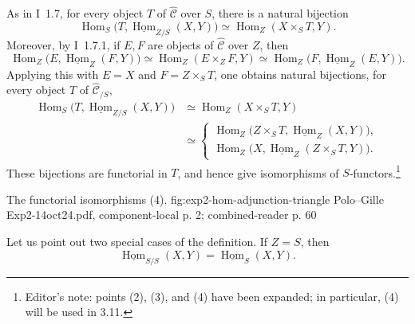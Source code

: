 As in I~1.7, for every object \(T\) of \(\widehat{\mathscr C}\) over
\(S\), there is a natural bijection
\begin{equation}
  \operatorname{Hom}_S
    \bigl(T,\underline{\operatorname{Hom}}_{Z/S}(X,Y)\bigr)
  \simeq \operatorname{Hom}_Z(X\times_S T,Y).
  \tag{2}
\end{equation}
Moreover, by I~1.7.1, if \(E,F\) are objects of
\(\widehat{\mathscr C}\) over \(Z\), then
\[
  \operatorname{Hom}_Z\bigl(E,\underline{\operatorname{Hom}}_Z(F,Y)\bigr)
  \simeq \operatorname{Hom}_Z(E\times_ZF,Y)
  \simeq
  \operatorname{Hom}_Z\bigl(F,\underline{\operatorname{Hom}}_Z(E,Y)\bigr).
\]
Applying this with \(E=X\) and \(F=Z\times_ST\), one obtains natural
bijections, for every object \(T\) of
\(\widehat{\mathscr C}_{/S}\),
\begin{equation}
\begin{aligned}
  \operatorname{Hom}_S
    \bigl(T,\underline{\operatorname{Hom}}_{Z/S}(X,Y)\bigr)
  &\simeq \operatorname{Hom}_Z(X\times_ST,Y)\\
  &\simeq
  \begin{cases}
    \operatorname{Hom}_Z\bigl(Z\times_ST,
      \underline{\operatorname{Hom}}_Z(X,Y)\bigr),\\
    \operatorname{Hom}_Z\bigl(X,
      \underline{\operatorname{Hom}}_Z(Z\times_ST,Y)\bigr).
  \end{cases}
\end{aligned}
\tag{3}
\end{equation}
These bijections are functorial in \(T\), and hence give isomorphisms of
\(S\)-functors.\footnote{Editor's note: points (2), (3), and (4) have been
expanded; in particular, (4) will be used in 3.11.}

  {The functorial isomorphisms (4).}
  {fig:exp2-hom-adjunction-triangle}
  {Polo--Gille Exp2-14oct24.pdf, component-local p. 2; combined-reader p. 60}

Let us point out two special cases of the definition. If \(Z=S\), then
\[
  \underline{\operatorname{Hom}}_{S/S}(X,Y)
  =\underline{\operatorname{Hom}}_S(X,Y).
\]

